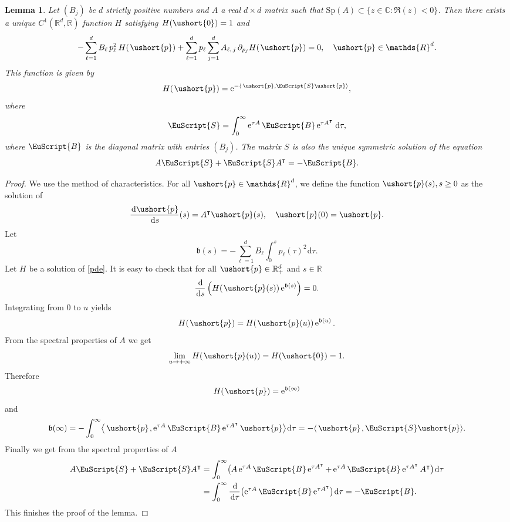 \documentclass[JEP,XML,SOM,Unicode]{cedram}
\numberwithin{equation}{section}
\theoremstyle{plain}
\newtheorem{lemma}[theorem]{Lemma}
\theoremstyle{definition}
\newcommand{\real}{\mathbb{R}}
\newcommand{\rpd}{\mathbb{R}_+^d}
\newcommand{\Sp}{\mathrm{Sp}}
\newcommand{\vp}{\ushort{p}}
\newcommand{\e}{\operatorname{e}}
\newcommand{\dd}{\hspace{1pt}\mathrm{d}}
\begin{document}
\begin{lemma}\label{uniquesol}
Let $(B_{j})$ be $d$ strictly positive numbers and $A$ a real $d\times
d$ matrix
such that $\Sp(A)\subset\{z\in\mathds{C}: \Re(z)<0\}$. Then
there exists a unique $C^{1}(\mathds{R}^d,\mathds{R})$ function $H$ satisfying
$H(\ushort{0})=1$ and
\begin{equation}
\label{pde}
-\sum_{\ell=1}^{d}B_{\ell}\, p_{\ell}^2\,H(\hspace{1pt}\vp)+\sum_{\ell=1}^{d} p_{\ell}\sum_{j=1}^{d}A_{\ell,\,j}\,\partial_{p_{j}}H(\hspace{1pt}\vp)=0,\quad \vp\in \mathds{R}^d.
\end{equation}
This function is given by
\[
H(\hspace{1pt}\vp)=\e^{-\langle\, \vp,\EuScript{S}\vp \rangle},
\]
where
\[
\EuScript{S}=\int_{0}^{\infty}\e^{\tau A}\EuScript{B}\e^{\tau A^{\intercal}}\dd\tau,
\]
where $\EuScript{B}$ is the diagonal matrix with entries $(B_{j})$.
The matrix $S$ is also the unique symmetric solution of the
equation
\[
A \EuScript{S}+\EuScript{S} A^{\intercal}=-\EuScript{B}.
\]
\end{lemma}
\begin{proof} We use the method of characteristics. For all $\vp\in \mathds{R}^d$, we define the function
$\vp(s), s\geq 0$ as the solution of
\[
\frac{\dd\vp}{\dd s}(s)= A^{\intercal}\vp(s),\quad\vp(0)=\vp.
\]
Let
\[
\mathfrak{b}(s)=-\sum_{\ell=1}^d B_{\ell} \int_{0}^{s} p_{\ell}(\tau)^2\dd\tau.
\]
Let $H$ be a solution of \eqref{pde}. It is easy to check that for all $\vp\in\rpd$ and $s\in\real$
\[
\frac{\dd}{\dd s}\left(H\!\left(\hspace{1pt}\vp(s)\right)\e^{\mathfrak{b}(s)}\right)=0.
\]
Integrating from $0$ to $u$ yields
\[
H(\hspace{1pt}\vp)=H\!\left(\hspace{1pt}\vp(u)\right) \e^{\mathfrak{b}(u)}.
\]
From the spectral properties of $A$ we get
\[
\lim_{u\to+\infty}H\!\left(\hspace{1pt}\vp(u)\right) =H(\ushort{0})=1.
\]
Therefore
\[
H(\hspace{1pt}\vp)=\e^{\mathfrak{b}(\infty)}
\]
and
\[
\mathfrak{b}(\infty)=-\int_{0}^{\infty}\bigl\langle\,\vp\hspace{1pt},\e^{\tau A}\EuScript{B}\e^{\tau A^{\intercal}}\vp\bigr\rangle\dd\tau
=-\langle\, \vp\hspace{1pt},\EuScript{S}\vp\rangle.
\]
Finally we get from the spectral properties of $A$
\begin{align*}
A \EuScript{S}+\EuScript{S} A^{\intercal}
&= \int_{0}^{\infty} \bigl(A\e^{\tau A}\EuScript{B}\e^{\tau A^{\intercal}}+\e^{\tau A}\EuScript{B}\e^{\tau A^{\intercal}} A^{\intercal} \bigr)
\dd\tau\\
&= \int_{0}^{\infty}\frac{\dd}{\dd\tau} \bigl(\e^{\tau A}\EuScript{B}\e^{\tau A^{\intercal}} \bigr)\dd\tau
=-\EuScript{B}.
\end{align*}
This finishes the proof of the lemma.
\end{proof}




\end{document}
